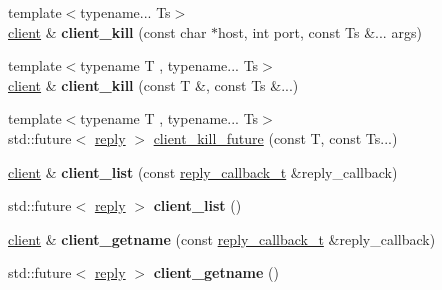 \begin{DoxyCompactItemize}
\item 
\mbox{\label{classcpp__redis_1_1client_a38df8e614a5ac9533a1993b7dec7be6b}} 
{\footnotesize template$<$typename... Ts$>$ }\\\hyperlink{classcpp__redis_1_1client}{client} \& {\bfseries client\+\_\+kill} (const char $\ast$host, int port, const Ts \&... args)
\item 
\mbox{\label{classcpp__redis_1_1client_a1e2dd6cdcdb4307ceda0f866fe0a154f}} 
{\footnotesize template$<$typename T , typename... Ts$>$ }\\\hyperlink{classcpp__redis_1_1client}{client} \& {\bfseries client\+\_\+kill} (const T \&, const Ts \&...)
\item 
{\footnotesize template$<$typename T , typename... Ts$>$ }\\std\+::future$<$ \hyperlink{classcpp__redis_1_1reply}{reply} $>$ \hyperlink{classcpp__redis_1_1client_ae6f09b6c022c910b79fb90a47291f511}{client\+\_\+kill\+\_\+future} (const T, const Ts...)
\item 
\mbox{\label{classcpp__redis_1_1client_a9c2e307ab54f42ce50bdd42e1c6a363b}} 
\hyperlink{classcpp__redis_1_1client}{client} \& {\bfseries client\+\_\+list} (const \hyperlink{classcpp__redis_1_1client_a061a1140d36d2eaeda82b09a0bb3f9f2}{reply\+\_\+callback\+\_\+t} \&reply\+\_\+callback)
\item 
\mbox{\label{classcpp__redis_1_1client_a0480140cc584e6dd2a0a6fab9da10cc5}} 
std\+::future$<$ \hyperlink{classcpp__redis_1_1reply}{reply} $>$ {\bfseries client\+\_\+list} ()
\item 
\mbox{\label{classcpp__redis_1_1client_ac4e058eaa75eb04c7a8017a779d5015e}} 
\hyperlink{classcpp__redis_1_1client}{client} \& {\bfseries client\+\_\+getname} (const \hyperlink{classcpp__redis_1_1client_a061a1140d36d2eaeda82b09a0bb3f9f2}{reply\+\_\+callback\+\_\+t} \&reply\+\_\+callback)
\item 
\mbox{\label{classcpp__redis_1_1client_a89068e68b418906e9e34cb9a95f7a179}} 
std\+::future$<$ \hyperlink{classcpp__redis_1_1reply}{reply} $>$ {\bfseries client\+\_\+getname} ()
\item 

\end{DoxyCompactItemize}
